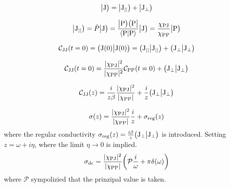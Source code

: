 %
\begin{align}
	\big|{\mathrm{J}}\big) = \big|{\mathrm{J}_{\mid\mid}}\big) + \big|{\mathrm{J}_{\bot}}\big)
\end{align}
%

%
\begin{align}
	\oket{\mt{J}_{\mid\mid}} = \hat{P}\oket{\mt{J}} = \frac{\odyad{\mt{P}}{\mt{P}}}{\braket{\mt{P}}{\mt{P}}} \oket{\mt{J}} = \frac{\chi_{\mt{PJ}}}{\chi_{\mt{PP}}} \oket{\mt{P}}
\end{align}
%

%
\begin{align}
	\mathcal{C}_{\mathrm{JJ}}(t=0) = \big({\mathrm{J}(0)}\big|{\mathrm{J}(0)}\big) = \big({\mathrm{J}_{\mid\mid}}\big|{\mathrm{J}_{\mid\mid}}\big) + \big({\mathrm{J}_{\bot}}\big|{\mathrm{J}_{\bot}}\big)
\end{align}
%

%
\begin{align}
	\mathcal{C}_{\mathrm{JJ}}(t=0) = \frac{\vert\chi_{\mathrm{PJ}}\vert^{2}}{\vert\chi_{\mathrm{PP}}\vert^{2}} \mathcal{C}_{\mathrm{PP}}(t=0) + \big({\mathrm{J}_{\bot}}\big|{\mathrm{J}_{\bot}}\big)
\end{align}
%

%
\begin{align}
	\mathcal{C}_{\mathrm{JJ}}(z) = \frac{i}{z \beta} \frac{\vert\chi_{\mathrm{PJ}}\vert^{2}}{\vert\chi_{\mathrm{PP}}\vert} + \frac{i}{z} \big({\mathrm{J}_{\bot}}\big|{\mathrm{J}_{\bot}}\big)
\end{align}
%

%
\begin{align}
	\sigma (z) = \frac{\vert\chi_{\mathrm{PJ}}\vert^{2}}{\vert\chi_{\mathrm{PP}}\vert} \frac{i}{z}  + \sigma_{\mathrm{reg}}(z)
\end{align}
%
where the regular conductivity $\sigma_{\mathrm{reg}}(z) = \frac{i \beta}{z} \big({\mathrm{J}_{\bot}}\big|{\mathrm{J}_{\bot}}\big)$ is introduced.
Setting $z = \omega + i\eta$, where the limit $\eta \to 0$ is implied.
%
\begin{align}
	\sigma_{\mathrm{dc}} = \frac{\vert\chi_{\mathrm{PJ}}\vert^{2}}{\vert\chi_{\mathrm{PP}}\vert} \bigg( \mathcal{P} \frac{i}{\omega} + \pi \delta(\omega) \bigg)
\end{align}
%
where $\mathcal{P}$ sympolizied that the prinzipal value is taken.































